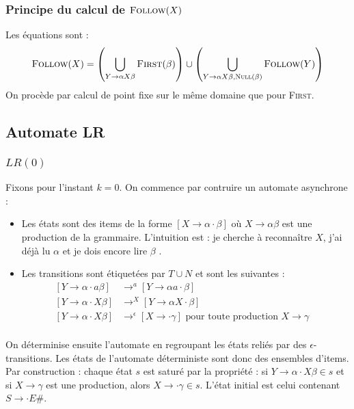 \documentclass{cours}
\begin{document}
\subsubsection{Principe du calcul de $\textsc{Follow}(X)$}
Les équations sont :
\[
    \textsc{Follow}(X) = \left(\bigcup_{Y \rightarrow \alpha X\beta} \textsc{First}(\beta)\right) \cup \left(\bigcup_{Y\rightarrow \alpha X \beta, \textsc{Null}(\beta)} \textsc{Follow}(Y)\right)
\]
On procède par calcul de point fixe sur le même domaine que pour \textsc{First}.

\subsection{Automate LR}
\subsubsection{$LR(0)$}
Fixons pour l'instant $k = 0$. On commence par contruire un automate asynchrone :
\begin{itemize}
    \item Les états sont des items de la forme $\left[X \rightarrow \alpha \cdot \beta\right]$ où $X\rightarrow \alpha\beta$ est une production de la grammaire. L'intuition est : \og je cherche à reconnaître $X$, j'ai déjà lu $\alpha$ et je dois encore lire $\beta$ \fg.
    \item Les transitions sont étiquetées par $T \cup N$ et sont les suivantes :
          \begin{equation*}
              \begin{aligned}
                  \left[Y \rightarrow \alpha \cdot a\beta \right] & \rightarrow^{a} \left[Y \rightarrow \alpha a \cdot \beta\right]                                                    & \\
                  \left[Y \rightarrow \alpha \cdot X\beta \right] & \rightarrow^{X} \left[Y \rightarrow \alpha X \cdot \beta\right]                                                    & \\
                  \left[Y \rightarrow \alpha \cdot X\beta \right] & \rightarrow^{\epsilon} \left[X \rightarrow \cdot \gamma\right] \text{ pour toute production } X \rightarrow \gamma & \\
              \end{aligned}
          \end{equation*}
\end{itemize}

On déterminise ensuite l'automate en regroupant les états reliés par des $\epsilon$-transitions. Les états de l'automate déterministe sont donc des ensembles d'items.\\
Par construction : chaque état $s$ est saturé par la propriété : si $Y \rightarrow \alpha \cdot X\beta \in s$ et si $X \rightarrow \gamma$ est une production, alors $X \rightarrow \cdot\gamma \in s$. L'état initial est celui contenant $S \rightarrow \cdot E\#$.\\
\end{document}
